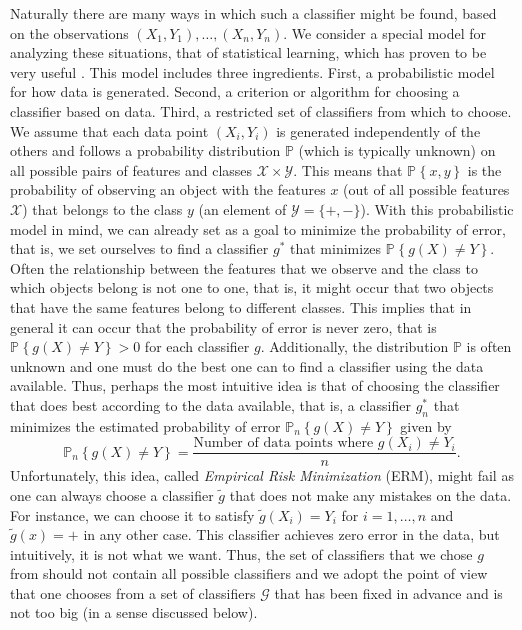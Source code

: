 \documentclass{uvamath}
\newcommand*{\calG}{\mathcal{G}}
\newcommand*{\calX}{\mathcal{X}}
\newcommand*{\calY}{\mathcal{Y}}
\newcommand*{\bbP}{\mathbb{P}}
\newcommand*{\prob}[2][]{\mathbb{P}_{#1}\left\{#2\right\}}
\theoremstyle{remark}
\theoremstyle{definition}
\theoremstyle{definition}
\theoremstyle{definition}
\theoremstyle{definition}
\theoremstyle{definition}
\begin{document}
Naturally there are many ways in which such a classifier might be
found, based on the observations $(X_1,Y_1),\dots,(X_n,Y_n)$. We
consider a special model for analyzing these situations, that of
statistical learning, which has proven to be very useful
\citep{vapnik_overview_1999}. This model includes three ingredients.
First, a probabilistic model for how data is generated. Second, a
criterion or algorithm for choosing a classifier based on data. Third,
a restricted set of classifiers from which to choose. We assume that
each data point $(X_i,Y_i)$ is generated independently of the others
and follows a probability distribution $\bbP$ (which is typically
unknown) on all possible pairs of features and classes
$\calX\times\calY$. This means that $\prob{x,y}$ is the probability of
observing an object with the features $x$ (out of all possible
features $\calX$) that belongs to the class $y$ (an element of
$\calY = \{+,-\}$). With this probabilistic model in mind, we can
already set as a goal to minimize the probability of error, that is,
we set ourselves to find a classifier $g^*$ that minimizes
$\prob{g(X)\neq Y}$. Often the relationship between the features that
we observe and the class to which objects belong is not one to one,
that is, it might occur that two objects that have the same features
belong to different classes. This implies that in general it can occur
that the probability of error is never zero, that is
$\prob{g(X)\neq Y}>0$ for each classifier $g$. Additionally, the
distribution $\bbP$ is often unknown and one must do the best one can
to find a classifier using the data available. Thus, perhaps the most
intuitive idea is that of choosing the classifier that does best
according to the data available, that is, a classifier $g^*_n$ that
minimizes the estimated probability of error $\prob[n]{g(X)\neq Y}$
given by
\begin{equation*}
  \prob[n]{g(X)\neq Y} = \frac{\text{Number of data points where }
    g(X_i)\neq Y_i}{n}.
\end{equation*}
Unfortunately, this idea, called \textit{Empirical Risk Minimization}
(ERM), might fail as one can always choose a classifier $\tilde{g}$
that does not make any mistakes on the data. For instance, we can
choose it to satisfy $\tilde{g}(X_i)=Y_i$ for $i=1,\dots,n$ and
$\tilde{g}(x) = +$ in any other case.  This classifier achieves zero
error in the data, but intuitively, it is not what we want. Thus, the
set of classifiers that we chose $g$ from should not contain all
possible classifiers and we adopt the point of view that one chooses
from a set of classifiers $\calG$ that has been fixed in advance and
is not too big (in a sense discussed below).
\end{document}
